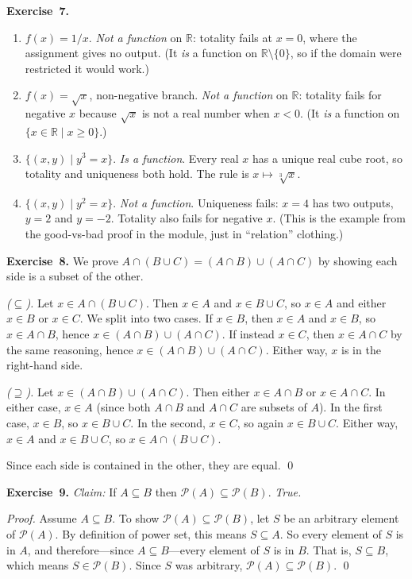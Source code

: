 \documentclass[11pt]{article}
\begin{document}
\medskip
\textbf{Exercise~7.}
\begin{enumerate}[label=(\alph*)]
  \item $f(x) = 1/x$. \emph{Not a function} on $\mathbb{R}$: totality fails at $x = 0$, where the assignment gives no output. (It \emph{is} a function on $\mathbb{R} \setminus \{0\}$, so if the domain were restricted it would work.)
  \item $f(x) = \sqrt{x}$, non-negative branch. \emph{Not a function} on $\mathbb{R}$: totality fails for negative $x$ because $\sqrt{x}$ is not a real number when $x < 0$. (It \emph{is} a function on $\{x \in \mathbb{R} \mid x \geq 0\}$.)
  \item $\{(x, y) \mid y^3 = x\}$. \emph{Is a function}. Every real $x$ has a unique real cube root, so totality and uniqueness both hold. The rule is $x \mapsto \sqrt[3]{x}$.
  \item $\{(x, y) \mid y^2 = x\}$. \emph{Not a function}. Uniqueness fails: $x = 4$ has two outputs, $y = 2$ and $y = -2$. Totality also fails for negative $x$. (This is the example from the good-vs-bad proof in the module, just in ``relation'' clothing.)
\end{enumerate}

\medskip
\textbf{Exercise~8.}
We prove $A \cap (B \cup C) = (A \cap B) \cup (A \cap C)$ by showing each side is a subset of the other.

\emph{($\subseteq$).}
Let $x \in A \cap (B \cup C)$. Then $x \in A$ and $x \in B \cup C$, so $x \in A$ and either $x \in B$ or $x \in C$. We split into two cases. If $x \in B$, then $x \in A$ and $x \in B$, so $x \in A \cap B$, hence $x \in (A \cap B) \cup (A \cap C)$. If instead $x \in C$, then $x \in A \cap C$ by the same reasoning, hence $x \in (A \cap B) \cup (A \cap C)$. Either way, $x$ is in the right-hand side.

\emph{($\supseteq$).}
Let $x \in (A \cap B) \cup (A \cap C)$. Then either $x \in A \cap B$ or $x \in A \cap C$. In either case, $x \in A$ (since both $A \cap B$ and $A \cap C$ are subsets of $A$). In the first case, $x \in B$, so $x \in B \cup C$. In the second, $x \in C$, so again $x \in B \cup C$. Either way, $x \in A$ and $x \in B \cup C$, so $x \in A \cap (B \cup C)$.

Since each side is contained in the other, they are equal. \qed

\medskip
\textbf{Exercise~9.}
\emph{Claim:} If $A \subseteq B$ then $\mathcal{P}(A) \subseteq \mathcal{P}(B)$. \emph{True.}

\emph{Proof.} Assume $A \subseteq B$. To show $\mathcal{P}(A) \subseteq \mathcal{P}(B)$, let $S$ be an arbitrary element of $\mathcal{P}(A)$. By definition of power set, this means $S \subseteq A$. So every element of $S$ is in $A$, and therefore---since $A \subseteq B$---every element of $S$ is in $B$. That is, $S \subseteq B$, which means $S \in \mathcal{P}(B)$. Since $S$ was arbitrary, $\mathcal{P}(A) \subseteq \mathcal{P}(B)$. \qed
\end{document}
